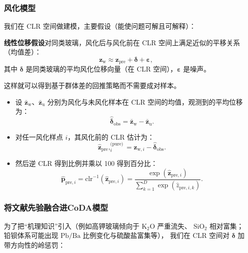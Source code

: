 \documentclass[withoutpreface,bwprint]{cumcmthesis}
\begin{document}
\subsubsection{风化模型}

我们在 CLR 空间做建模，主要假设（能使问题可解且可解释）：

\textbf{线性位移假设}\quad 对同类玻璃，风化后与风化前在 CLR 空间上满足近似的平移关系（均值差）：  
\[
\mathbf{z}_\text{w} \approx \mathbf{z}_\text{pre} + \boldsymbol{\delta} + \boldsymbol{\varepsilon},
\]  
其中 $\boldsymbol{\delta}$ 是同类玻璃的平均风化位移向量（在 CLR 空间），$\boldsymbol{\varepsilon}$ 是噪声。  

这样就可以得到基于群体差的回推策略而不需要成对样本。  

\begin{itemize}
\item 设 $\bar{\mathbf{z}}_\text{w}$、$\bar{\mathbf{z}}_\text{u}$ 分别为风化与未风化样本在 CLR 空间的均值，观测到的平均位移为：  
\[
\hat{\boldsymbol{\delta}}_\text{obs} = \bar{\mathbf{z}}_\text{w} - \bar{\mathbf{z}}_\text{u}.
\]  

\item 对任一风化样点 $i$，其风化前的 CLR 估计为：  
\[
\hat{\mathbf{z}}_\text{pre},_i^\text{(pure)} = \mathbf{z}_{\text{w},i} - \hat{\boldsymbol{\delta}}_\text{obs}.
\]  

\item 然后逆 CLR 得到比例并乘以 100 得到百分比：  
\[
\hat{\mathbf{p}}_{\text{pre},i} = \text{clr}^{-1}\!\left( \hat{\mathbf{z}}_{\text{pre},i} \right) 
= \frac{\exp\!\left( \hat{\mathbf{z}}_{\text{pre},i} \right)}{\sum_{k=1}^D \exp\!\left( \hat{z}_{\text{pre},i,k} \right)}.
\]  
\end{itemize}

\subsubsection{将文献先验融合进CoDA模型}

为了把“机理知识”引入（例如高钾玻璃倾向于 $\mathrm{K}_2\mathrm{O}$ 严重流失、
$\mathrm{SiO}_2$ 相对富集；铅钡体系可能出现 $\mathrm{Pb}/\mathrm{Ba}$ 比例变化与硫酸盐富集等），
我们在 CLR 空间对 $\boldsymbol{\delta}$ 加带方向性的岭惩罚：
\end{document}
